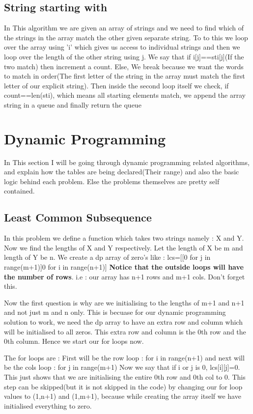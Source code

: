\documentclass{article}
\newcommand{\nd}{\noindent}
\begin{document}
\subsection{String starting with}
In This algorithm we are given an array of strings and we need to find which of the strings in the array match the other given separate string. To to this we loop over the array using 'i' which gives us access to individual strings and then we loop over the length of the other string using j. We say that if i[j]==sti[j](If the two match) then increment a count. Else, We break because we want the words to match in order(The first letter of the string in the array must match the first letter of our explicit string). Then inside the second loop itself we check, if count==len(sti), which means all starting elements match, we append the array string in a queue and finally return the queue

\section{Dynamic Programming} 
In This section I will be going through dynamic programming related algorithms, and explain how the tables are being declared(Their range) and also the basic logic behind each problem. Else the problems themselves are pretty self contained.

\subsection{Least Common Subsequence}
In this problem we define a function which takes two strings namely : X and Y. Now we find the lengths of X and Y respectively. Let the length of X be m and length of Y be n. We create a dp array of zero's like :
lcs=[[0 for j in range(m+1)]0 for i in range(n+1)] \textbf{Notice that the outside loops will have the number of rows}. i.e : our array has n+1 rows and m+1 cols. Don't forget this. 

\nd Now the first question is why are we initialising to the lengths of m+1 and n+1 and not just m and n only. This is becuase for our dynamic programming solution to work, we need the dp array to have an extra row and column which will be initialised to all zeros. This extra row and column is the 0th row and the 0th column. Hence we start our for loops now. 

\nd The for loops are : First will be the row loop : for i in range(n+1) and next will be the cols loop : for j in range(m+1)
Now we say that if i or j is 0,  lcs[i][j]=0. This just shows that we are initialising the entire 0th row and 0th col to 0. This step can be skipped(but it is not skipped in the code) by changing our for loop values to (1,n+1) and (1,m+1), because while creating the array itself we have initialised everything to zero. 
\end{document}
